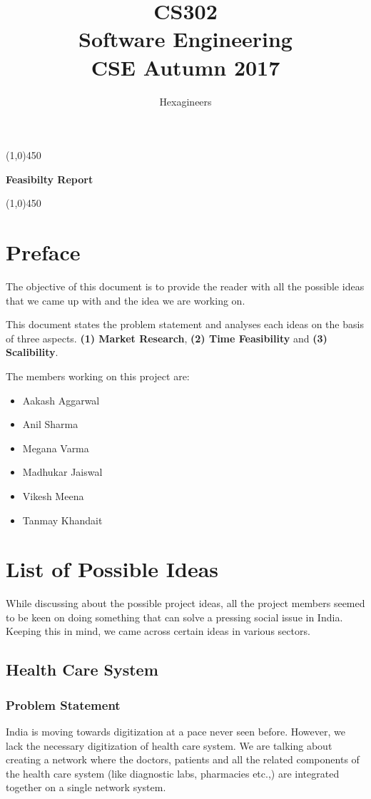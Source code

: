 \documentclass{article}
\title{\textbf{CS302}\\\HUGE Software Engineering\\
\LARGE CSE\hspace{\labelsep}\textbullet\hspace{\labelsep} Autumn 2017
}
\author{Hexagineers}
\begin{document}
\maketitle
\line(1,0){450}

\begin{center}
\textbf{\Huge Feasibilty Report}
\end{center}
\line(1,0){450}
\newpage

\tableofcontents
\newpage

\section{Preface}
\par The objective of this document is to provide the reader with all the possible ideas that we came up with and the idea we are working on.

\par This document states the problem statement and analyses each ideas on the basis of three aspects. \textbf{(1) Market Research}, \textbf{(2) Time Feasibility} and \textbf{(3) Scalibility}. 
\par The members working on this project are:
\begin{itemize}
    \item Aakash Aggarwal
    \item Anil Sharma
    \item Megana Varma
    \item Madhukar Jaiswal
    \item Vikesh Meena
    \item Tanmay Khandait
\end{itemize}
\newpage
\section{List of Possible Ideas}
\par While discussing about the possible project ideas, all the project members seemed to be keen on doing something that can solve a pressing social issue in India. Keeping this in mind, we came across certain ideas in various sectors.
\subsection{Health Care System}
\subsubsection{Problem Statement}
\par India is moving towards digitization at a pace never seen before. However, we lack the necessary digitization of health care system. 
We are talking about creating a network where the doctors, patients and all the related components of the health care system (like diagnostic labs, pharmacies etc.,) are integrated together on a single network system.
\end{document}
